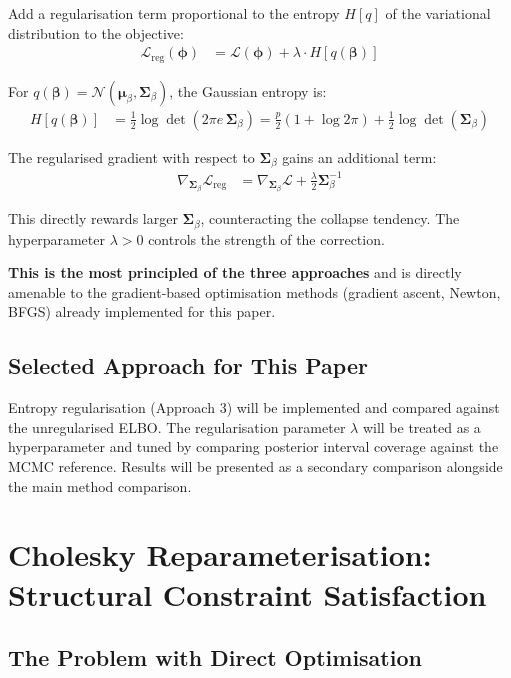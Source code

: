 \documentclass[11pt,a4paper]{article}
\begin{document}
Add a regularisation term proportional to the entropy $H[q]$ of the variational distribution to the objective:
\begin{align}
  \mathcal{L}_{\text{reg}}(\bm{\phi}) &= \mathcal{L}(\bm{\phi}) + \lambda \cdot H[q(\bm{\beta})]
\end{align}

For $q(\bm{\beta}) = \mathcal{N}(\bm{\mu}_\beta, \bm{\Sigma}_\beta)$, the Gaussian entropy is:
\begin{align}
  H[q(\bm{\beta})] &= \frac{1}{2} \log \det(2\pi e\, \bm{\Sigma}_\beta)
               = \frac{p}{2}(1 + \log 2\pi) + \frac{1}{2}\log\det(\bm{\Sigma}_\beta)
\end{align}

The regularised gradient with respect to $\bm{\Sigma}_\beta$ gains an additional term:
\begin{align}
  \nabla_{\bm{\Sigma}_\beta} \mathcal{L}_{\text{reg}} &= \nabla_{\bm{\Sigma}_\beta} \mathcal{L} + \frac{\lambda}{2} \bm{\Sigma}_\beta^{-1}
\end{align}

This directly rewards larger $\bm{\Sigma}_\beta$, counteracting the collapse tendency. The hyperparameter $\lambda > 0$ controls the strength of the correction.

\textbf{This is the most principled of the three approaches} and is directly amenable to the gradient-based optimisation methods (gradient ascent, Newton, BFGS) already implemented for this paper.

\subsection*{Selected Approach for This Paper}

Entropy regularisation (Approach 3) will be implemented and compared against the unregularised ELBO. The regularisation parameter $\lambda$ will be treated as a hyperparameter and tuned by comparing posterior interval coverage against the MCMC reference. Results will be presented as a secondary comparison alongside the main method comparison.



\section{Cholesky Reparameterisation: Structural Constraint Satisfaction}\label{app:cholesky}

\subsection*{The Problem with Direct Optimisation}
\end{document}
